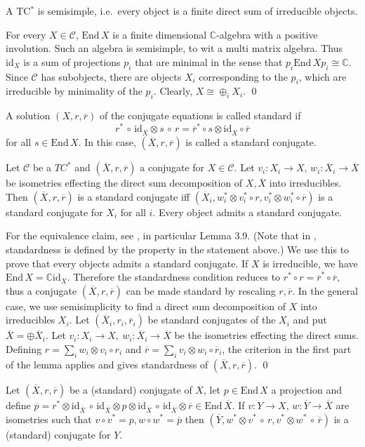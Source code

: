 \documentclass[11pt]{article}
\theoremstyle{definition}
\theoremstyle{definition}
\theoremstyle{remark}
\def\2#1{{\mathcal #1}}
\def\7#1{{\mathbb #1}}
\def\ol#1{{\overline #1}}
\newcommand{\End}{\mathrm{End}}
\newcommand{\mcirc}{\,\circ\,}
\newcommand{\rarr}{\rightarrow}
\def\id{\mathrm{id}}
\begin{document}
\blemma \label{lem-semisim} 
A TC$^*$ is semisimple, i.e.\ every object is a finite direct sum of irreducible objects.
\elemma

\prf For every $X\in\2C$, $\End\,X$ is a finite dimensional $\7C$-algebra with a positive
involution. Such an algebra is semisimple, to wit a multi matrix algebra. Thus $\id_X$ is a sum of
projections $p_i$ that are minimal in the sense that $p_i\End\,Xp_i\cong\7C$. Since $\2C$ has
subobjects, there are objects $X_i$ corresponding to the $p_i$, which are irreducible by minimality
of the $p_i$. Clearly, $X\cong\oplus_iX_i$.
\qed

\bdefin {}
A solution $(X,r,\ol{r})$ of the conjugate equations is called standard if
\[ r^* \mcirc \id_{\ol{X}}\otimes s\mcirc r= \ol{r}^*\circ s\otimes\id_{\ol{X}}\circ\ol{r} \]
for all $s\in\End\,X$. In this case, $(\ol{X},r,\ol{r})$ is called a standard conjugate.
\edefin

\blemma \label{lem-stand1}
Let $\2C$ be a $TC^*$ and $(\ol{X},r,\ol{r})$ a conjugate for $X\in\2C$. Let $v_i:X_i\rarr X$,
$w_i:\ol{X_i}\rarr\ol{X}$ be isometries effecting the direct sum decomposition of $X,\ol{X}$ into
irreducibles. Then $(\ol{X},r,\ol{r})$ is a standard conjugate iff
$(\ol{X_i},w_i^*\otimes v_i^*\circ r,v_i^*\otimes w_i^*\circ\ol{r})$ 
is a standard conjugate for $X_i$ for all $i$. Every object admits a standard conjugate.
\elemma

\prf For the equivalence claim, see \cite{LR}, in particular Lemma 3.9. (Note that in \cite{LR},
standardness is defined by the property in the statement above.) We use this to prove that every
objects admits a standard conjugate. If $X$ is irreducible, we have $\End\,X=\7C\id_X$. Therefore
the standardness condition reduces to $r^*\circ r=\ol{r}^*\circ\ol{r}$, thus a conjugate
$(\ol{X},r,\ol{r})$ can be made standard by rescaling $r,\ol{r}$. In the general case, we use
semisimplicity to find a direct sum decomposition of $X$ into irreducibles $X_i$.  
Let $(\ol{X_i},r_i,\ol{r}_i)$ be standard conjugates of the $X_i$ and put $\ol{X}=\oplus\ol{X}_i$.
Let $v_i:X_i\rarr X,\ w_i:\ol{X}_i\rarr\ol{X}$ be the isometries effecting the direct sums. Defining
$r=\sum_i w_i\otimes v_i\circ r_i$ and $\ol{r}=\sum_i v_i\otimes w_i\circ\ol{r}_i$, the criterion in
the first part of the lemma applies and gives standardness of $(\ol{X},r,\ol{r})$.
\qed

\blemma \label{lem-conj}
Let $(\ol{X},r,\ol{r})$ be a (standard) conjugate of $X$, let $p\in\End\,X$ a projection and define
$\ol{p}=r^*\otimes\id_{\ol{X}}\mcirc\id_{\ol{X}}\otimes p\otimes\id_{\ol{X}}\mcirc\id_{\ol{X}}\otimes\ol{r}\in\End\,\ol{X}$.
If $v: Y\rarr X$, $w:\ol{Y}\rarr\ol{X}$ are isometries such that $v\circ v^*=p, w\circ w^*=\ol{p}$ then
$(\ol{Y},w^*\otimes v^*\mcirc r,v^*\otimes w^*\mcirc\ol{r})$ is a (standard) conjugate for $Y$.
\elemma
\end{document}
